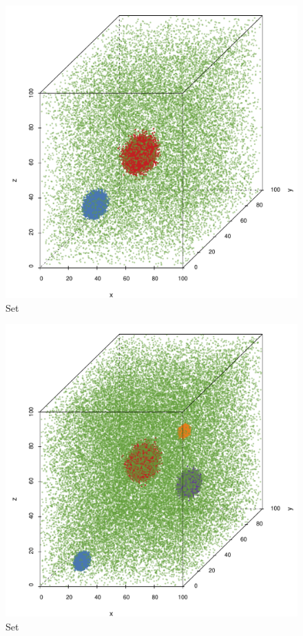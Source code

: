 
\begin{subfigure}{0.23\textwidth}
	\centering
	\includegraphics[width=\textwidth, height=0.15\textheight, keepaspectratio=true]{experiment/img/datasetplot_ferdosi_2_60000}
	\caption{Set \ferdosiTwo}
	\label{fig:experiment:multisphere:ferdosi2}
\end{subfigure}	
\begin{subfigure}{0.23\textwidth}
	\centering
	\includegraphics[width=\textwidth, height=0.15\textheight, keepaspectratio=true]{experiment/img/datasetplot_ferdosi_3_120000}
	\caption{Set \ferdosiThree}
	\label{fig:experiment:multisphere:ferdosi3}
\end{subfigure}	
